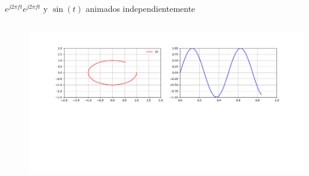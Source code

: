 \begin{frame}{$e^{j2\pi ft}$}{$e^{j2\pi ft}$ y $\sin(t)$ animados independientemente}
   \handsonicon
       \begin{columns}[c]
          \hspace{2pt}
          \begin{column}{.3\textwidth}
             
          \end{column}
          \hspace{2pt}
          \vrule
          \hspace{2pt}
          \begin{column}{.3\textwidth}
             
          \end{column}
          \hspace{2pt}
          \vrule
          \hspace{2pt}
          \begin{column}{.4\textwidth}
             \centering\includegraphics[width=1.0\textwidth]{3_clase/euler2}
          \end{column}
          \hspace{2pt}
       \end{columns}
   \vfill
\end{frame}
